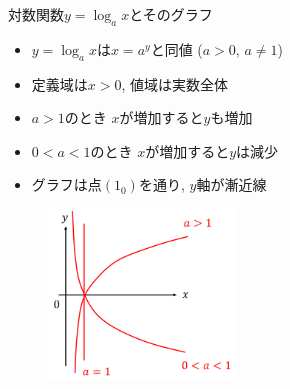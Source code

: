 \documentclass[aspectratio=169, 12pt]{beamer} %
\begin{document}
\begin{frame}{対数関数$y=\log_a x$とそのグラフ}
    \begin{itemize}
        \item $y=\log_a x$は$x=a^y$と同値 ($a>0$, $a\neq 1$)
        \item 定義域は$x>0$, 値域は実数全体
        \item $a>1$のとき $x$が増加すると$y$も増加
        \item $0<a<1$のとき $x$が増加すると$y$は減少
        \item グラフは点$(1_0)$を通り, $y$軸が漸近線
    \end{itemize}
    \begin{figure}[htbp]
        \begin{center}
            \includegraphics[width=50mm]{fig/2.png}
        \end{center}
    \end{figure}
\end{frame}
\end{document}
